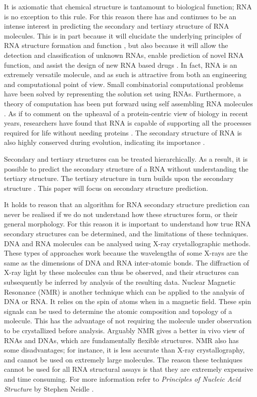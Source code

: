 \documentclass{cshonours}
\begin{document}
It is axiomatic that chemical structure is tantamount to biological function; RNA is no exception to this rule. For this reason there has and continues to be an intense interest in predicting the secondary and tertiary structure of RNA molecules. This is in part because it will elucidate the underlying principles of RNA structure formation and function \cite{conn1998rna}, but also because it will allow the detection and classification of unknown RNAs, enable prediction of novel RNA function, and assist the design of new RNA based drugs \cite{condon2003problems}. In fact, RNA is an extremely versatile molecule, and as such is attractive from both an engineering and computational point of view. Small combinatorial computational problems have been solved by representing the solution set using RNAs. Furthermore, a theory of computation has been put forward using self assembling RNA molecules \cite{condon2003problems}. As if to comment on the upheaval of a protein-centric view of biology in recent years, researchers have found that RNA is capable of supporting all the processes required for life without needing proteins \cite{condon2003problems}. The secondary structure of RNA is also highly conserved during evolution, indicating its importance \cite{hofacker2008rna}. 

Secondary and tertiary structures can be treated hierarchically. As a result, it is possible to predict the secondary structure of a RNA without understanding the tertiary structure. The tertiary structure in turn builds upon the secondary structure \cite{tinoco1999rna}. This paper will focus on secondary structure prediction.

It holds to reason that an algorithm for RNA secondary structure prediction can never be realised if we do not understand how these structures form, or their general morphology. For this reason it is important to understand how true RNA secondary structures can be determined, and the limitations of these techniques. DNA and RNA molecules can be analysed using X-ray crystallographic methods. These types of approaches work because the wavelengths of some X-rays are the same as the dimensions of DNA and RNA inter-atomic bonds. The diffraction of X-ray light by these molecules can thus be observed, and their structures can subsequently be inferred by analysis of the resulting data. Nuclear Magnetic Resonance (NMR) is another technique which can be applied to the analysis of DNA or RNA. It relies on the spin of atoms when in a magnetic field. These spin signals can be used to determine the atomic composition and topology of a molecule. This has the advantage of not requiring the molecule under observation to be crystallized before analysis. Arguably NMR gives a better in vivo view of RNAs and DNAs, which are fundamentally flexible structures. NMR also has some disadvantages; for instance, it is less accurate than X-ray crystallography, and cannot be used on extremely large molecules. The reason these techniques cannot be used for all RNA structural assays is that they are extremely expensive and time consuming. For more information refer to \emph{Principles of Nucleic Acid Structure} by Stephen Neidle \cite{neidle2010principles}.
\end{document}
